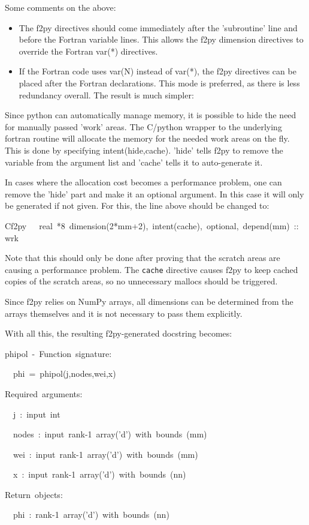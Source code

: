 Some comments on the above:

\begin{itemize}
\item The f2py directives should come immediately after the 'subroutine'
line and before the Fortran variable lines. This allows the f2py dimension
directives to override the Fortran var({*}) directives.
\item If the Fortran code uses var(N) instead of var({*}), the f2py directives
can be placed after the Fortran declarations. This mode is preferred,
as there is less redundancy overall. The result is much simpler: 
\end{itemize}




Since python can automatically manage memory, it is possible to hide
the need for manually passed 'work' areas. The C/python wrapper to
the underlying fortran routine will allocate the memory for the needed
work areas on the fly. This is done by specifying intent(hide,cache).
'hide' tells f2py to remove the variable from the argument list and
'cache' tells it to auto-generate it.

In cases where the allocation cost becomes a performance problem,
one can remove the 'hide' part and make it an optional argument. In
this case it will only be generated if not given. For this, the line
above should be changed to:

\begin{lyxcode}
{\small Cf2py~~~real~{*}8~dimension(2{*}mm+2),~intent(cache),~optional,~depend(mm)~::~wrk~}{\small \par}
\end{lyxcode}
Note that this should only be done after proving that the scratch
areas are causing a performance problem. The \texttt{cache} directive
causes f2py to keep cached copies of the scratch areas, so no unnecessary
mallocs should be triggered.

Since f2py relies on NumPy arrays, all dimensions can be determined from the
arrays themselves and it is not necessary to pass them explicitly.

With all this, the resulting f2py-generated docstring becomes: 

\begin{lyxcode}
phipol~-~Function~signature:

~~phi~=~phipol(j,nodes,wei,x)

Required~arguments:

~~j~:~input~int

~~nodes~:~input~rank-1~array('d')~with~bounds~(mm)

~~wei~:~input~rank-1~array('d')~with~bounds~(mm)

~~x~:~input~rank-1~array('d')~with~bounds~(nn)

Return~objects:

~~phi~:~rank-1~array('d')~with~bounds~(nn)
\end{lyxcode}

